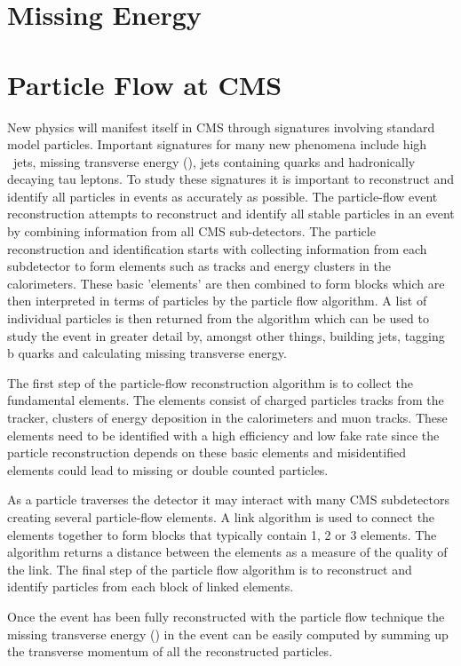 \section{Missing Energy}

\section{Particle Flow at CMS}

New physics will manifest itself in CMS through signatures involving standard
model particles. Important signatures for many new phenomena include high \Pt\
jets, missing transverse energy (\met), jets containing \Pbottom quarks and
hadronically decaying tau leptons. To study these signatures it is important to
reconstruct and identify all particles in events as accurately as possible. The
particle-flow event reconstruction attempts to reconstruct and identify all
stable particles in an event by combining information from all CMS
sub-detectors. The particle reconstruction and identification starts with
collecting information from each subdetector to form elements such as tracks
and energy clusters in the calorimeters. These basic 'elements' are then
combined to form blocks which are then interpreted in terms of particles by the
particle flow algorithm. A list of individual particles is then returned from
the algorithm which can be used to study the event in greater detail by,
amongst other things, building jets, tagging b quarks and calculating missing
transverse energy.\cite{PF}

The first step of the particle-flow reconstruction algorithm is to collect the
fundamental elements. The elements consist of charged particles tracks from the
tracker, clusters of energy deposition in the calorimeters and muon tracks.
These elements need to be identified with a high efficiency and low fake rate
since the particle reconstruction depends on these basic elements and
misidentified elements could lead to missing or double counted
particles.\cite{PF}

As a particle traverses the detector it may interact with many CMS subdetectors
creating several particle-flow elements. A link algorithm is used to connect
the elements together to form blocks that typically contain 1, 2 or 3 elements.
The algorithm returns a distance between the elements as a measure of the
quality of the link. The final step of the particle flow algorithm is to
reconstruct and identify particles from each block of linked elements.\cite{PF}

Once the event has been fully reconstructed with the particle flow technique
the missing transverse energy (\met) in the event can be easily computed by
summing up the transverse momentum of all the reconstructed particles.\cite{PF}

